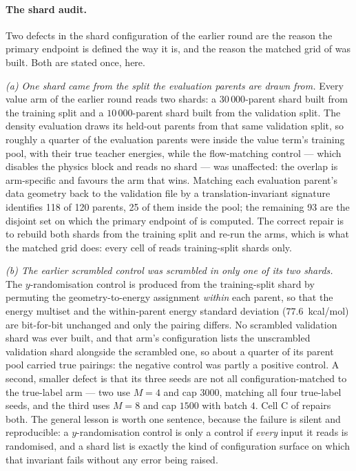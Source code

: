 \paragraph{The shard audit.} Two defects in the shard configuration of the earlier
round are the reason the primary endpoint is defined the way it is, and the reason the
matched grid of  was built. Both are stated once, here.

\emph{(a) One shard came from the split the evaluation parents are drawn from.} Every
value arm of the earlier round reads two shards: a $30\,000$-parent shard built from
the training split and a $10\,000$-parent shard built from the validation split. The
density evaluation draws its held-out parents from that same validation split, so
roughly a quarter of the evaluation parents were inside the value term's training pool,
with their true teacher energies, while the flow-matching control --- which disables the
physics block and reads no shard --- was unaffected: the overlap is arm-specific and
favours the arm that wins. Matching each evaluation parent's data geometry back to the
validation file by a translation-invariant signature identifies 118 of 120 parents, 25
of them inside the pool; the remaining 93 are the disjoint set on which the primary
endpoint of  is computed. The correct repair is to rebuild both shards
from the training split and re-run the arms, which is what the matched grid does: every
cell of  reads training-split shards only.

\emph{(b) The earlier scrambled control was scrambled in only one of its two shards.}
The $y$-randomisation control \citep{ruecker2007yrandom} is produced from the
training-split shard by permuting the geometry-to-energy assignment \emph{within} each
parent, so that the energy multiset and the within-parent energy standard deviation
($77.6$~kcal/mol) are bit-for-bit unchanged and only the pairing differs. No scrambled
validation shard was ever built, and that arm's configuration lists the unscrambled
validation shard alongside the scrambled one, so about a quarter of its parent pool
carried true pairings: the negative control was partly a positive control. A second,
smaller defect is that its three seeds are not all configuration-matched to the
true-label arm --- two use $M = 4$ and cap $3000$, matching all four true-label seeds,
and the third uses $M = 8$ and cap $1500$ with batch $4$. Cell C of 
repairs both. The general lesson is worth one sentence, because the failure is silent
and reproducible: a $y$-randomisation control is only a control if \emph{every} input it
reads is randomised, and a shard list is exactly the kind of configuration surface on
which that invariant fails without any error being raised.

